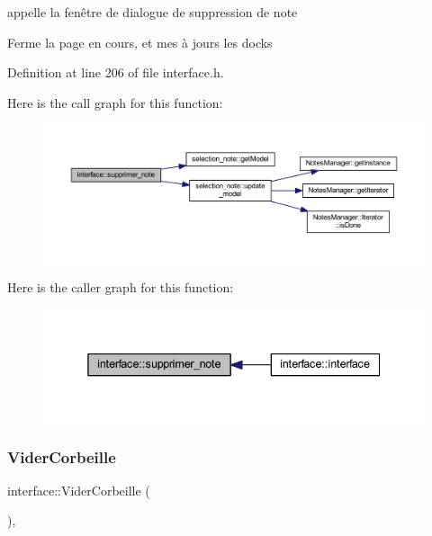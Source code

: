 appelle la fenêtre de dialogue de suppression de note 

Ferme la page en cours, et mes à jours les docks 

Definition at line 206 of file interface.\+h.

Here is the call graph for this function\+:\nopagebreak
\begin{figure}[H]
\begin{center}
\leavevmode
\includegraphics[width=350pt]{classinterface_aca23c755ba40ca8198010ff0487b22a8_cgraph}
\end{center}
\end{figure}
Here is the caller graph for this function\+:\nopagebreak
\begin{figure}[H]
\begin{center}
\leavevmode
\includegraphics[width=338pt]{classinterface_aca23c755ba40ca8198010ff0487b22a8_icgraph}
\end{center}
\end{figure}
\mbox{\label{classinterface_a430ee153cb2ea74b9103081d48cd61f3}} 
\subsubsection{\texorpdfstring{Vider\+Corbeille}{ViderCorbeille}}
{\footnotesize\ttfamily interface\+::\+Vider\+Corbeille (\begin{DoxyParamCaption}{ }\end{DoxyParamCaption})\hspace{0.3cm}{\ttfamily [inline]}, {\ttfamily [slot]}}



